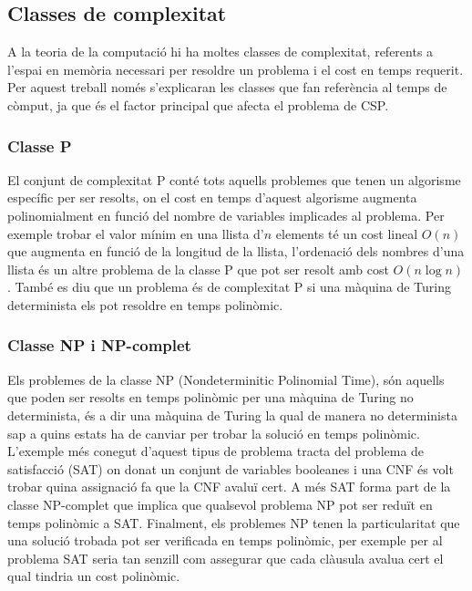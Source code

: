 \subsection{Classes de complexitat}
A la teoria de la computació hi ha moltes classes de complexitat, referents a l'espai en memòria necessari per resoldre un problema i el cost en temps requerit. Per aquest treball només s'explicaran les classes que fan referència al temps de còmput, ja que és el factor principal que afecta el problema de CSP.

\subsubsection{Classe P}
El conjunt de complexitat P conté tots aquells problemes que tenen un algorisme específic per ser resolts, on el cost en temps d'aquest algorisme augmenta polinomialment en funció del nombre de variables implicades al problema. Per exemple trobar el valor mínim en una llista d'$n$ elements té un cost lineal $O(n)$ que augmenta en funció de la longitud de la llista, l'ordenació dels nombres d'una llista és un altre problema de la classe P que pot ser resolt amb cost $O(n\log{}n)$. També es diu que un problema és de complexitat P si una màquina de Turing determinista els pot resoldre en temps polinòmic.

\subsubsection{Classe NP i NP-complet} \label{np and np-completeness}
Els problemes de la classe NP (Nondeterminitic Polinomial Time), són aquells que poden ser resolts en temps polinòmic per una màquina de Turing no determinista, és a dir una màquina de Turing la qual de manera no determinista sap a quins estats ha de canviar per trobar la solució en temps polinòmic. L'exemple més conegut d'aquest tipus de problema tracta del problema de satisfacció (SAT) on donat un conjunt de variables booleanes i una CNF és volt trobar quina assignació fa que la CNF avaluï cert. A més SAT forma part de la classe NP-complet que implica que qualsevol problema NP pot ser reduït en temps polinòmic a SAT. Finalment, els problemes NP tenen la particularitat que una solució trobada pot ser verificada en temps polinòmic, per exemple per al problema SAT seria tan senzill com assegurar que cada clàusula avalua cert el qual tindria un cost polinòmic.

